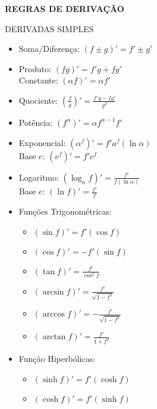 \documentclass[twocolumn, 10pt]{article}
\begin{document}
\MakeUppercase{\textbf{\Large Regras de Derivação}}

\vspace{8pt}
\MakeUppercase{Derivadas Simples}

\begin{itemize}[topsep=2pt]
    \item Soma/Diferença: $\left(f \pm g\right)' = f' \pm g'$
    \item Produto: $\left(fg\right)' = f'g + fg'$ \\[2pt]
        Constante: $\left(\alpha f\right)' = \alpha f'$
    \item Quociente: 
        $\displaystyle \left(\frac{f}{g}\right)' = \frac{f'g - fg'}{g^2}$
    \item Potência: $\displaystyle \left(f^\alpha\right)' = \alpha f^{\alpha - 1}f'$
    \item Exponencial: 
        $\displaystyle \left(\alpha^f\right)' = f' a^f (\ln \alpha)$ \\[2pt]
        Base $e$: $\displaystyle \left(e^f\right)' = f' e^f$
    \item Logaritmo: 
        $\displaystyle \left(\log_{\alpha} f\right)' = \frac{f'}{f (\ln \alpha)}$ \\[2pt]
        Base $e$: $\displaystyle \left(\ln f\right)' = \frac{f'}{f}$
    \item Funções Trigonométricas:
        \begin{itemize}[topsep=0pt]
            \item $(\sin f)' = f' (\cos f)$
            \item $(\cos f)' = -f' (\sin f)$
            \item $\displaystyle (\tan f)' = \frac{f'}{\cos^2 f}$
            \item $\displaystyle (\arcsin f)' = \frac{f'}{\sqrt{1-f^2}}$
            \item $\displaystyle (\arccos f)' = -\frac{f'}{\sqrt{1-f^2}}$
            \item $\displaystyle (\arctan f)' = \frac{f'}{1 + f^2}$
        \end{itemize}
    \item Função Hiperbólicas:
        \begin{itemize}[topsep=0pt]
            \item $(\sinh f)' = f' (\cosh f)$
            \item $(\cosh f)' = f' (\sinh f)$
        \end{itemize}
\end{itemize}
\end{document}
